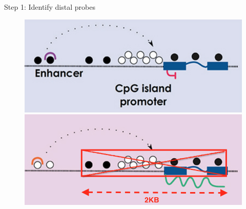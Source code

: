 \documentclass[slidestop,compress,11pt,xcolor=dvipsnames]{beamer}
\begin{document}






\begin{frame}{Step 1: Identify distal probes}
 \begin{figure}
  \centering
  \includegraphics[width=0.7\linewidth]{step1.png}
 \end{figure}
\end{frame}
\end{document}
